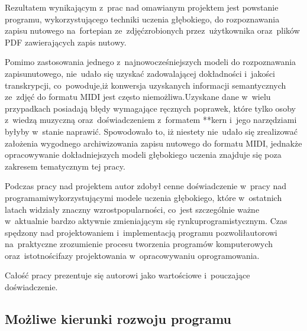 \documentclass[xodstep]{wnspt}
\begin{document}






\summary

Rezultatem wynikającym z~prac nad omawianym projektem jest powstanie programu, wykorzystującego techniki uczenia głębokiego, do rozpoznawania zapisu nutowego na~fortepian ze~zdjęć\linebreak zrobionych przez~użytkownika oraz~plików PDF zawierających zapis nutowy.

Pomimo zastosowania jednego z~najnowocześniejszych modeli do rozpoznawania zapisu\linebreak nutowego, nie~udało się uzyskać zadowalającej dokładności i~jakości transkrypcji, co~powoduje,\linebreak iż konwersja uzyskanych informacji semantycznych ze~zdjęć do formatu MIDI jest często niemożliwa.\linebreak Uzyskane dane w~wielu przypadkach posiadają błędy wymagające ręcznych poprawek, które tylko osoby z~wiedzą muzyczną oraz~doświadczeniem z~formatem **kern i~jego narzędziami byłyby w~stanie naprawić. Spowodowało to, iż niestety nie~udało się zrealizować założenia wygodnego archiwizowania zapisu nutowego do formatu MIDI, jednakże opracowywanie dokładniejszych modeli głębokiego uczenia znajduje się poza zakresem tematycznym tej pracy.

Podczas pracy nad projektem autor zdobył cenne doświadczenie w~pracy nad programami\linebreak wykorzystującymi modele uczenia głębokiego, które w~ostatnich latach widziały znaczny wzrost\linebreak popularności, co~jest szczególnie ważne w~aktualnie bardzo aktywnie zmieniającym się rynku\linebreak programistycznym. Czas spędzony nad projektowaniem i~implementacją programu pozwolił\linebreak autorowi na~praktyczne zrozumienie procesu tworzenia programów komputerowych oraz~istotności\linebreak fazy projektowania w~opracowywaniu oprogramowania.

Całość pracy prezentuje się autorowi jako wartościowe i~pouczające doświadczenie.

\vspace{5mm}

\subsection*{Możliwe kierunki rozwoju programu}
\end{document}
